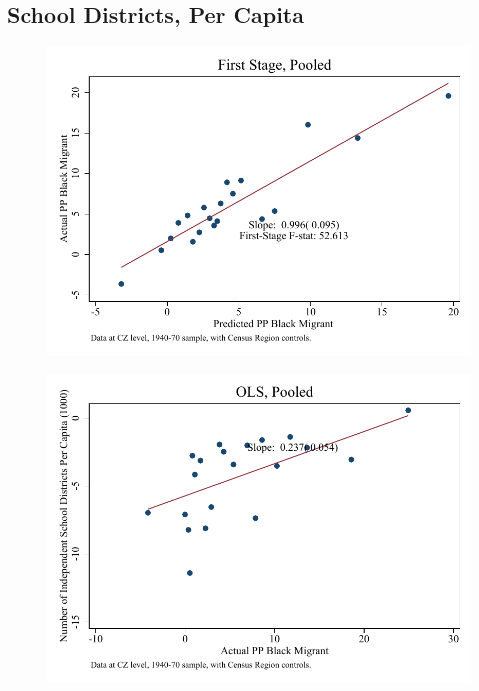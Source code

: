 \documentclass{article}
\begin{document}
\subsection{School Districts, Per Capita}

\clearpage
\begin{figure}
\centering
\includegraphics{figures/simplefigs/pooled_schdist_ind_pc_C3_fs.pdf}
\end{figure}
\clearpage
\begin{figure}
\centering
\includegraphics{figures/simplefigs/pooled_schdist_ind_pc_C3_ols.pdf}
\end{figure}
\clearpage
\end{document}
